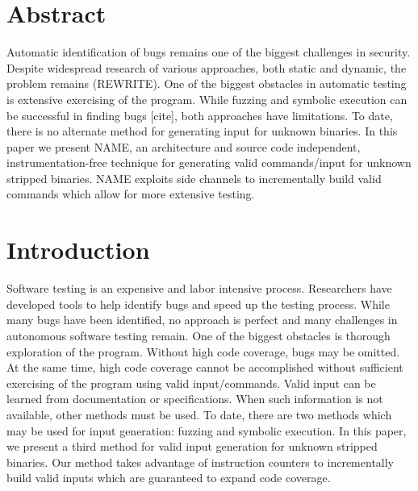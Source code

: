 \documentclass[11pt,twocolumn]{article}
\begin{document}
  
\section{Abstract}
Automatic identification of bugs remains one of the biggest challenges in security.
Despite widespread research of various approaches, both static and dynamic, the problem remains (REWRITE).
One of the biggest obstacles in automatic testing is extensive exercising of the program.
While fuzzing and symbolic execution can be successful in finding bugs [cite], both approaches have limitations.
To date, there is no alternate method for generating input for unknown binaries.
In this paper we present NAME, an architecture and source code independent, instrumentation-free technique for generating valid commands/input for unknown stripped binaries.
NAME exploits side channels to incrementally build valid commands which allow for more extensive testing.

\section{Introduction}

Software testing is an expensive and labor intensive process.
Researchers have developed tools to help identify bugs and speed up the testing process.
While many bugs have been identified, no approach is perfect and many challenges in autonomous software testing remain.
One of the biggest obstacles is thorough exploration of the program.
Without high code coverage, bugs may be omitted.
At the same time, high code coverage cannot be accomplished without sufficient exercising of the program using valid input/commands.
Valid input can be learned from documentation or specifications.
When such information is not available, other methods must be used.
To date, there are two methods which may be used for input generation: fuzzing and symbolic execution.
In this paper, we present a third method for valid input generation for unknown stripped binaries.
Our method takes advantage of instruction counters to incrementally build valid inputs which are guaranteed to expand code coverage.
\end{document}
